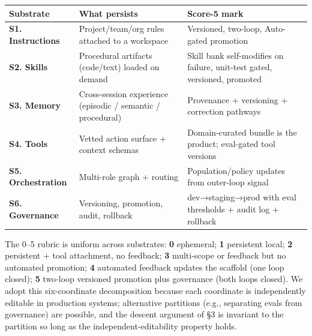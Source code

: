 \documentclass[
]{article}
\newcounter{none} %
\begin{document}
{\def\LTcaptype{none} %
\begin{longtable}[]{@{}
  >{\raggedright\arraybackslash}p{}
  >{\raggedright\arraybackslash}p{}
  >{\raggedright\arraybackslash}p{}@{}}
\toprule\noalign{}
\begin{minipage}[b]{\linewidth}\raggedright
Substrate
\end{minipage} & \begin{minipage}[b]{\linewidth}\raggedright
What persists
\end{minipage} & \begin{minipage}[b]{\linewidth}\raggedright
Score-5 mark
\end{minipage} \\
\midrule\noalign{}
\endhead
\bottomrule\noalign{}
\endlastfoot
\textbf{S1. Instructions} & Project/team/org rules attached to a
workspace & Versioned, two-loop, Auto-gated promotion \\
\textbf{S2. Skills} & Procedural artifacts (code/text) loaded on demand
& Skill bank self-modifies on failure, unit-test gated, versioned,
promoted \\
\textbf{S3. Memory} & Cross-session experience (episodic / semantic /
procedural) & Provenance + versioning + correction pathways \\
\textbf{S4. Tools} & Vetted action surface + context schemas &
Domain-curated bundle is the product; eval-gated tool versions \\
\textbf{S5. Orchestration} & Multi-role graph + routing &
Population/policy updates from outer-loop signal \\
\textbf{S6. Governance} & Versioning, promotion, audit, rollback &
dev→staging→prod with eval thresholds + audit log + rollback \\
\end{longtable}
}

The 0--5 rubric is uniform across substrates: \textbf{0} ephemeral;
\textbf{1} persistent local; \textbf{2} persistent + tool attachment, no
feedback; \textbf{3} multi-scope or feedback but no automated promotion;
\textbf{4} automated feedback updates the scaffold (one loop closed);
\textbf{5} two-loop versioned promotion plus governance (both loops
closed). We adopt this six-coordinate decomposition because each
coordinate is independently editable in production systems; alternative
partitions (e.g., separating evals from governance) are possible, and
the descent argument of §3 is invariant to the partition so long as the
independent-editability property holds.
\end{document}
